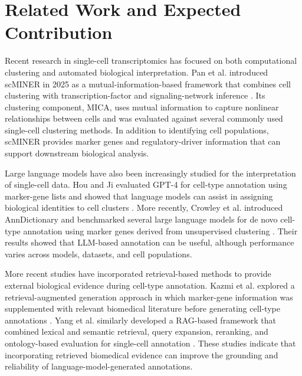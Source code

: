 \section{Related Work and Expected Contribution}
Recent research in single-cell transcriptomics has focused on both computational clustering and automated biological interpretation. Pan et al. introduced scMINER in 2025 as a mutual-information-based framework that combines cell clustering with transcription-factor and signaling-network inference \cite{pan2025scminer}. Its clustering component, MICA, uses mutual information to capture nonlinear relationships between cells and was evaluated against several commonly used single-cell clustering methods. In addition to identifying cell populations, scMINER provides marker genes and regulatory-driver information that can support downstream biological analysis.

Large language models have also been increasingly studied for the interpretation of single-cell data. Hou and Ji evaluated GPT-4 for cell-type annotation using marker-gene lists and showed that language models can assist in assigning biological identities to cell clusters \cite{hou2024gpt4}. More recently, Crowley et al. introduced AnnDictionary and benchmarked several large language models for de novo cell-type annotation using marker genes derived from unsupervised clustering \cite{crowley2025anndictionary}. Their results showed that LLM-based annotation can be useful, although performance varies across models, datasets, and cell populations.

More recent studies have incorporated retrieval-based methods to provide external biological evidence during cell-type annotation. Kazmi et al. explored a retrieval-augmented generation approach in which marker-gene information was supplemented with relevant biomedical literature before generating cell-type annotations \cite{kazmi2025beyond}. Yang et al. similarly developed a RAG-based framework that combined lexical and semantic retrieval, query expansion, reranking, and ontology-based evaluation for single-cell annotation \cite{yang2026rag}. These studies indicate that incorporating retrieved biomedical evidence can improve the grounding and reliability of language-model-generated annotations.

